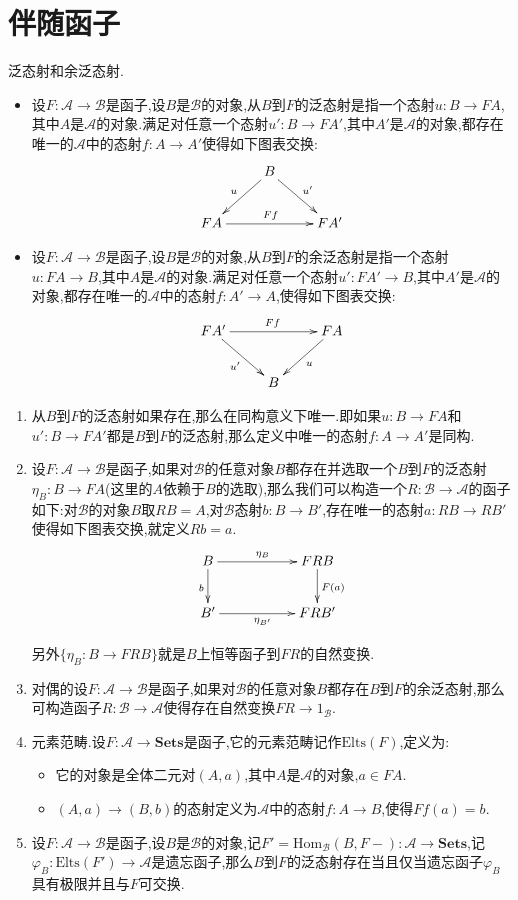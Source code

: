 \section{伴随函子}

泛态射和余泛态射.
\begin{itemize}
	\item 设$F:\mathscr{A}\to\mathscr{B}$是函子,设$B$是$\mathscr{B}$的对象,从$B$到$F$的泛态射是指一个态射$u:B\to FA$,其中$A$是$\mathscr{A}$的对象.满足对任意一个态射$u':B\to FA'$,其中$A'$是$\mathscr{A}$的对象,都存在唯一的$\mathscr{A}$中的态射$f:A\to A'$使得如下图表交换:
	$$\xymatrix{&B\ar[dl]_{u}\ar[dr]^{u'}&\\FA\ar[rr]^{Ff}&&FA'}$$
	\item 设$F:\mathscr{A}\to\mathscr{B}$是函子,设$B$是$\mathscr{B}$的对象,从$B$到$F$的余泛态射是指一个态射$u:FA\to B$,其中$A$是$\mathscr{A}$的对象.满足对任意一个态射$u':FA'\to B$,其中$A'$是$\mathscr{A}$的对象,都存在唯一的$\mathscr{A}$中的态射$f:A'\to A$,使得如下图表交换:
	$$\xymatrix{FA'\ar[rr]^{Ff}\ar[dr]_{u'}&&FA\ar[dl]^{u}\\&B&}$$
\end{itemize}
\begin{enumerate}
	\item 从$B$到$F$的泛态射如果存在,那么在同构意义下唯一.即如果$u:B\to FA$和$u':B\to FA'$都是$B$到$F$的泛态射,那么定义中唯一的态射$f:A\to A'$是同构.
	\item 设$F:\mathscr{A}\to\mathscr{B}$是函子,如果对$\mathscr{B}$的任意对象$B$都存在并选取一个$B$到$F$的泛态射$\eta_B:B\to FA$(这里的$A$依赖于$B$的选取),那么我们可以构造一个$R:\mathscr{B}\to\mathscr{A}$的函子如下:对$\mathscr{B}$的对象$B$取$RB=A$,对$\mathscr{B}$态射$b:B\to B'$,存在唯一的态射$a:RB\to RB'$使得如下图表交换,就定义$Rb=a$.
	$$\xymatrix{B\ar[rr]^{\eta_B}\ar[d]_b&&FRB\ar[d]^{F(a)}\\B'\ar[rr]_{\eta_{B'}}&&FRB'}$$
	
	另外$\{\eta_B:B\to FRB\}$就是$B$上恒等函子到$FR$的自然变换.
	\item 对偶的设$F:\mathscr{A}\to\mathscr{B}$是函子,如果对$\mathscr{B}$的任意对象$B$都存在$B$到$F$的余泛态射,那么可构造函子$R:\mathscr{B}\to\mathscr{A}$使得存在自然变换$FR\to 1_{\mathscr{B}}$.
	\item 元素范畴.设$F:\mathscr{A}\to\textbf{Sets}$是函子,它的元素范畴记作$\mathrm{Elts}(F)$,定义为:
	\begin{itemize}
		\item 它的对象是全体二元对$(A,a)$,其中$A$是$\mathscr{A}$的对象,$a\in FA$.
		\item $(A,a)\to(B,b)$的态射定义为$\mathscr{A}$中的态射$f:A\to B$,使得$Ff(a)=b$.
	\end{itemize}
	\item 设$F:\mathscr{A}\to\mathscr{B}$是函子,设$B$是$\mathscr{B}$的对象,记$F'=\mathrm{Hom}_{\mathscr{B}}(B,F-):\mathscr{A}\to\textbf{Sets}$,记$\varphi_B:\mathrm{Elts}(F')\to\mathscr{A}$是遗忘函子,那么$B$到$F$的泛态射存在当且仅当遗忘函子$\varphi_B$具有极限并且与$F$可交换.
\end{enumerate}

